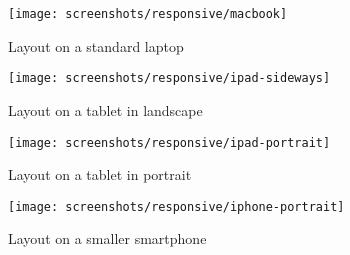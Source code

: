 \begin{figure}[h]
    \centering
    \texttt{[image: screenshots/responsive/macbook]}
    \caption{Layout on a standard laptop}
    \label{fig:responsive-macbook}
\end{figure}

\begin{figure}[h]
    \centering
    \texttt{[image: screenshots/responsive/ipad-sideways]}
    \caption{Layout on a tablet in landscape}
    \label{fig:responsive-ipad}
\end{figure}

\begin{figure}[h]
    \centering
    \texttt{[image: screenshots/responsive/ipad-portrait]}
    \caption{Layout on a tablet in portrait}
    \label{fig:responsive-ipad2}
\end{figure}

\begin{figure}[h]
    \centering
    \texttt{[image: screenshots/responsive/iphone-portrait]}
    \caption{Layout on a smaller smartphone}
    \label{fig:responsive-iphone}
\end{figure}




